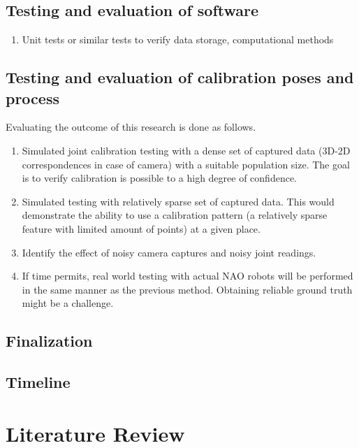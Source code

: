 \documentclass[english, printversion, nomenclature, notitle]{tuvisionthesis} %
\begin{document}
\section{Testing and evaluation of software}
\begin{enumerate}
	\item Unit tests or similar tests to verify data storage, computational methods
\end{enumerate}

\section{Testing and evaluation of calibration poses and process}
Evaluating the outcome of this research is done as follows.

\begin{enumerate}
	\item Simulated joint calibration testing with a dense set of captured data (3D-2D correspondences in case of camera) with a suitable population size.
	\subitem The goal is to verify calibration is possible to a high degree of confidence.
	\item Simulated testing with relatively sparse set of captured data. This would demonstrate the ability to use a calibration pattern (a relatively sparse feature with limited amount of points) at a given place.
	\item Identify the effect of noisy camera captures and noisy joint readings.
	\item If time permits, real world testing with actual NAO robots will be performed in the same manner as the previous method. Obtaining reliable ground truth might be a challenge.
	
\end{enumerate}

\section{Finalization}

\section{Timeline}

\chapter{Literature Review}
\end{document}
